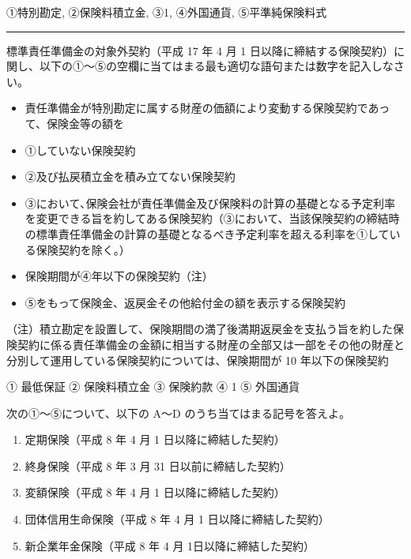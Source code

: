 \documentclass[report,gutter=10mm,fore-edge=10mm,uplatex,dvipdfmx]{jlreq}
\begin{document}

①特別勘定, ②保険料積立金, ③1, ④外国通貨, ⑤平準純保険料式

\begin{center}\rule{0.5\linewidth}{0.5pt}\end{center}


標準責任準備金の対象外契約（平成 17 年 4 月 1
日以降に締結する保険契約）に関し、以下の①～⑤の空欄に当てはまる最も適切な語句または数字を記入しなさい。

\begin{itemize}
\tightlist
\item
  責任準備金が特別勘定に属する財産の価額により変動する保険契約であって、保険金等の額を
\item
  ①していない保険契約
\item
  ②及び払戻積立金を積み立てない保険契約
\item
  ③において､保険会社が責任準備金及び保険料の計算の基礎となる予定利率を変更できる旨を約してある保険契約（③において、当該保険契約の締結時の標準責任準備金の計算の基礎となるべき予定利率を超える利率を①している保険契約を除く。）
\item
  保険期間が④年以下の保険契約（注）
 \item ⑤をもって保険金、返戻金その他給付金の額を表示する保険契約
\end{itemize}

（注）積立勘定を設置して、保険期間の満了後満期返戻金を支払う旨を約した保険契約に係る責任準備金の金額に相当する財産の全部又は一部をその他の財産と分別して運用している保険契約については、保険期間が
10 年以下の保険契約



① 最低保証 ② 保険料積立金 ③ 保険約款 ④ 1 ⑤ 外国通貨


次の①～⑤について、以下の A～D のうち当てはまる記号を答えよ。
\begin{enumerate} [(1)]
\item 定期保険（平成 8 年 4 月 1 日以降に締結した契約）
\item 終身保険（平成 8 年 3 月 31 日以前に締結した契約）
\item 変額保険（平成 8 年 4 月 1 日以降に締結した契約）
\item 団体信用生命保険（平成 8 年 4 月 1 日以降に締結した契約）
\item 新企業年金保険（平成 8 年 4 月 1日以降に締結した契約）
\end{enumerate} 
\end{document}
